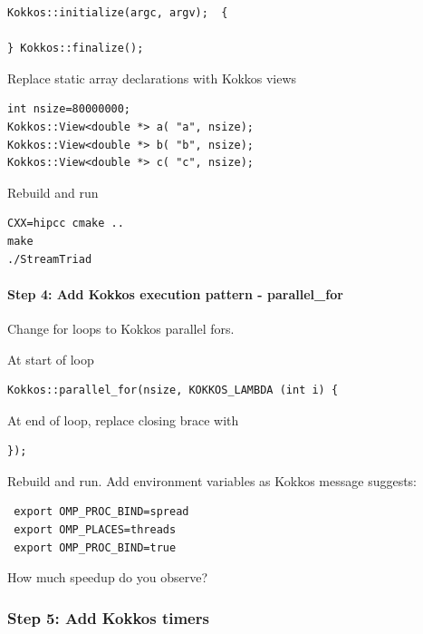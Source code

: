 \documentclass[
]{article}
\begin{document}
\begin{verbatim}
Kokkos::initialize(argc, argv);  {

} Kokkos::finalize();
\end{verbatim}

Replace static array declarations with Kokkos views

\begin{verbatim}
int nsize=80000000;
Kokkos::View<double *> a( "a", nsize);
Kokkos::View<double *> b( "b", nsize);
Kokkos::View<double *> c( "c", nsize);
\end{verbatim}

Rebuild and run

\begin{verbatim}
CXX=hipcc cmake ..
make
./StreamTriad
\end{verbatim}

\hypertarget{step-4-add-kokkos-execution-pattern---parallel_for}{%
\paragraph{Step 4: Add Kokkos execution pattern -
parallel\_for}\label{step-4-add-kokkos-execution-pattern---parallel_for}}

Change for loops to Kokkos parallel fors.

At start of loop

\begin{verbatim}
Kokkos::parallel_for(nsize, KOKKOS_LAMBDA (int i) {
\end{verbatim}

At end of loop, replace closing brace with

\begin{verbatim}
});
\end{verbatim}

Rebuild and run. Add environment variables as Kokkos message suggests:

\begin{verbatim}
 export OMP_PROC_BIND=spread
 export OMP_PLACES=threads
 export OMP_PROC_BIND=true
\end{verbatim}

How much speedup do you observe?

\hypertarget{step-5-add-kokkos-timers}{%
\subsubsection{Step 5: Add Kokkos
timers}\label{step-5-add-kokkos-timers}}
\end{document}
